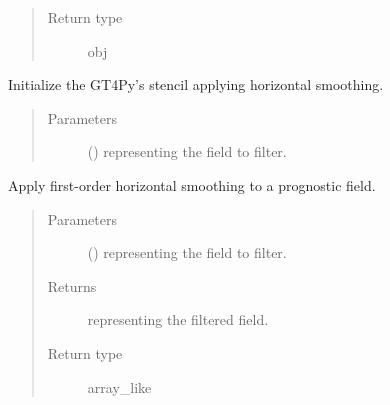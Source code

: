 \documentclass[letterpaper,10pt,english]{sphinxmanual}
\begin{document}
\begin{fulllineitems}
\begin{fulllineitems}
\begin{quote}
\begin{description}
\item[{Return type}] \leavevmode
obj

\end{description}\end{quote}

\end{fulllineitems}


\begin{fulllineitems}
\label{\detokenize{api:dycore.horizontal_smoothing.HorizontalSmoothingFirstOrderYZ._stencil_initialize}}
Initialize the GT4Py’s stencil applying horizontal smoothing.
\begin{quote}\begin{description}
\item[{Parameters}] \leavevmode
{} () \textendash{}  representing the field to filter.

\end{description}\end{quote}

\end{fulllineitems}


\begin{fulllineitems}
\label{\detokenize{api:dycore.horizontal_smoothing.HorizontalSmoothingFirstOrderYZ.apply}}
Apply first-order horizontal smoothing to a prognostic field.
\begin{quote}\begin{description}
\item[{Parameters}] \leavevmode
{} () \textendash{}  representing the field to filter.

\item[{Returns}] \leavevmode
{} representing the filtered field.

\item[{Return type}] \leavevmode
array\_like

\end{description}\end{quote}

\end{fulllineitems}


\end{fulllineitems}
\end{document}
